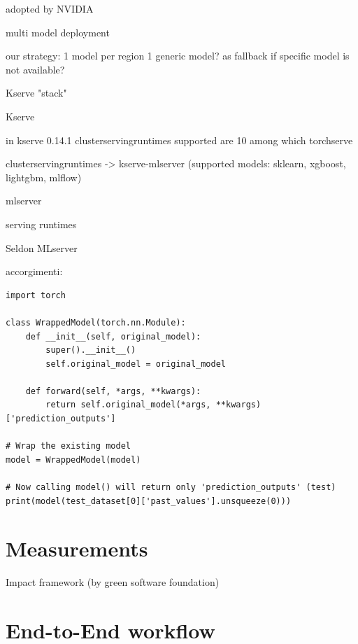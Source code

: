 adopted by NVIDIA



multi model deployment



our strategy:
1 model per region
1 generic model? as fallback if specific model is not available?




Kserve "stack"

Kserve

in kserve 0.14.1
clusterservingruntimes
supported are 10
among which 
torchserve

clusterservingruntimes -> kserve-mlserver (supported models: sklearn, xgboost, lightgbm, mlflow)

mlserver









serving runtimes

Seldon MLserver


accorgimenti: \\

\lstset{style=python}
\begin{lstlisting}[caption={Wrapping a PyTorch Model}, label={lst:wrapped_model}]
import torch

class WrappedModel(torch.nn.Module):
    def __init__(self, original_model):
        super().__init__()
        self.original_model = original_model

    def forward(self, *args, **kwargs):
        return self.original_model(*args, **kwargs)['prediction_outputs']

# Wrap the existing model
model = WrappedModel(model)

# Now calling model() will return only 'prediction_outputs' (test)
print(model(test_dataset[0]['past_values'].unsqueeze(0)))
\end{lstlisting}









\section{Measurements}
Impact framework (by green software foundation)

\section{End-to-End workflow}
\label{sec:e2eflow}

